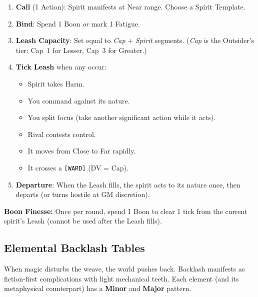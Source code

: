 \begin{enumerate}
    \item \textbf{Call} (1 Action): Spirit manifests at Near range. Choose a Spirit Template.
    \item \textbf{Bind}: Spend 1 Boon \emph{or} mark 1 Fatigue.
    \item \textbf{Leash Capacity}: Set equal to \textit{Cap} + \textit{Spirit} segments. (\textit{Cap} is the Outsider's tier: Cap~1 for Lesser, Cap~3 for Greater.)
    \item \textbf{Tick Leash} when any occur:
        \begin{itemize}
            \item Spirit takes Harm.
            \item You command against its nature.
            \item You split focus (take another significant action while it acts).
            \item Rival contests control.
            \item It moves from Close to Far rapidly.
            \item It crosses a \texttt{[WARD]} (DV = Cap).
        \end{itemize}
    \item \textbf{Departure}: When the Leash fills, the spirit acts to its nature once, then departs (or turns hostile at GM discretion).
\end{enumerate}
\textbf{Boon Finesse:} Once per round, spend 1 Boon to clear 1 tick from the current spirit's Leash (cannot be used after the Leash fills).

\subsection{Elemental Backlash Tables}\label{sec:backlash_tables}

When magic disturbs the weave, the world pushes back. Backlash manifests as fiction‑first complications with light mechanical teeth. Each element (and its metaphysical counterpart) has a \textbf{Minor} and \textbf{Major} pattern.

